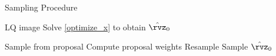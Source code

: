 \begin{algorithm}[t]
\caption{  Sampling Procedure}
\label{alg}
\begin{algorithmic}
\REQUIRE LQ image 
\STATE Solve \eqref{optimize_x} to obtain $\hat{\rvz}_0$

    \STATE Sample from proposal
    \STATE Compute proposal weights
    \STATE Resample 
\ENDFOR
\STATE Sample $\hat{\rvz}_0$ 
\ENDFOR


\end{algorithmic}
\end{algorithm}